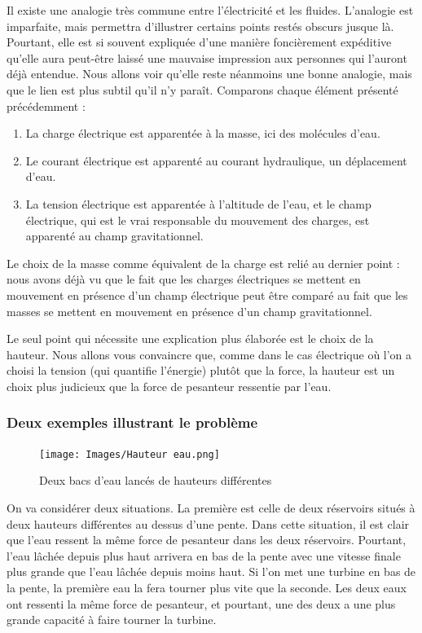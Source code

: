 \documentclass{article}
\begin{document}
Il existe une analogie très commune entre l'électricité et les fluides. L'analogie est imparfaite, mais permettra d'illustrer certains points restés obscurs jusque là. Pourtant, elle est si souvent expliquée d'une manière foncièrement expéditive qu'elle aura peut-être laissé une mauvaise impression aux personnes qui l'auront déjà entendue. Nous allons voir qu'elle reste néanmoins une bonne analogie, mais que le lien est plus subtil qu'il n'y paraît.
\newpage
\noindent Comparons chaque élément présenté précédemment :
\begin{enumerate}
    \item La charge électrique est apparentée à la masse, ici des molécules d'eau.
    \item Le courant électrique est apparenté au courant hydraulique, un déplacement d'eau.
    \item La tension électrique est apparentée à l'altitude de l'eau, et le champ électrique, qui est le vrai responsable du mouvement des charges, est apparenté au champ gravitationnel. 
\end{enumerate}

Le choix de la masse comme équivalent de la charge est relié au dernier point : nous avons déjà vu que le fait que les charges électriques se mettent en mouvement en présence d'un champ électrique peut être comparé au fait que les masses se mettent en mouvement en présence d'un champ gravitationnel.

Le seul point qui nécessite une explication plus élaborée est le choix de la hauteur. Nous allons vous convaincre que, comme dans le cas électrique où l'on a choisi la tension (qui quantifie l'énergie) plutôt que la force, la hauteur est un choix plus judicieux que la force de pesanteur ressentie par l'eau.

\subsubsection{Deux exemples illustrant le problème}

\begin{figure}[h]
\centering
\texttt{[image: Images/Hauteur eau.png]}
\caption{Deux bacs d'eau lancés de hauteurs différentes}
\label{fig:2hauteurs_singes}
\end{figure}

On va considérer deux situations. La première est celle de deux réservoirs situés à deux hauteurs différentes au dessus d'une pente. Dans cette situation, il est clair que l'eau ressent la même force de pesanteur dans les deux réservoirs. Pourtant, l'eau lâchée depuis plus haut arrivera en bas de la pente avec une vitesse finale plus grande que l'eau lâchée depuis moins haut. Si l'on met une turbine en bas de la pente, la première eau la fera tourner plus vite que la seconde. Les deux eaux ont ressenti la même force de pesanteur, et pourtant, une des deux a une plus grande capacité à faire tourner la turbine.
\end{document}
